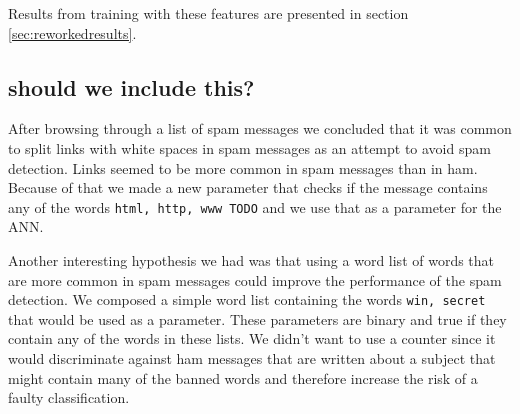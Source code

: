   Results from training with these features are presented in section
  \ref{sec:reworkedresults}.

  \subsection{should we include this?}
  After browsing through a list of spam messages we concluded that it was
  common to split links with white spaces in spam messages as an attempt to
  avoid spam detection. Links seemed to be more common in spam messages than in
  ham. Because of that we made a new parameter that checks if the message
  contains any of the words \texttt{html, http, www TODO} and we use that as a
  parameter for the ANN. 

  Another interesting hypothesis we had was that using a word list of words
  that are more common in spam messages could improve the performance of the
  spam detection. We composed a simple word list containing the words
  \texttt{win, secret} that would be used as a parameter.  These parameters are
  binary and true if they contain any of the words in these lists. We didn't
  want to use a counter since it would discriminate against ham messages that
  are written about a subject that might contain many of the banned words and
  therefore increase the risk of a faulty classification. 

